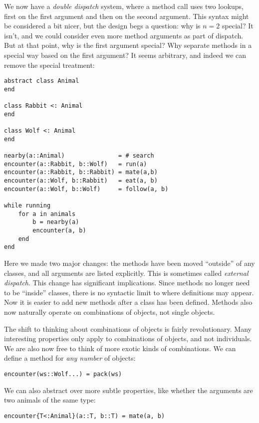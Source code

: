 We now have a \emph{double dispatch} system, where a method call
uses two lookups, first on the first argument and then on the
second argument.
This syntax might be considered a bit nicer, but the design
begs a question: why is $n=2$ special?
It isn't, and we could consider even more method arguments as part of
dispatch.
But at that point, why is the first argument special?
Why separate methods in a special way based on the first argument?
It seems arbitrary, and indeed we can remove the special treatment:

\begin{singlespace}
\begin{verbatim}
abstract class Animal
end

class Rabbit <: Animal
end

class Wolf <: Animal
end

nearby(a::Animal)               = # search
encounter(a::Rabbit, b::Wolf)   = run(a)
encounter(a::Rabbit, b::Rabbit) = mate(a,b)
encounter(a::Wolf, b::Rabbit)   = eat(a, b)
encounter(a::Wolf, b::Wolf)     = follow(a, b)

while running
    for a in animals
        b = nearby(a)
        encounter(a, b)
    end
end
\end{verbatim}
\end{singlespace}

Here we made two major changes: the methods have been moved ``outside''
of any classes, and all arguments are listed explicitly.
This is sometimes called \emph{external dispatch}.
This change has significant implications.
Since methods no longer need to be ``inside'' classes, there is no syntactic
limit to where definitions may appear.
Now it is easier to add new methods after a class has been defined.
Methods also now naturally operate on combinations of objects, not single objects.

The shift to thinking about combinations of objects is fairly revolutionary.
Many interesting properties only apply to combinations of objects, and not
individuals.
We are also now free to think of more exotic kinds of combinations.
We can define a method for \emph{any number} of objects:

\begin{verbatim}
encounter(ws::Wolf...) = pack(ws)
\end{verbatim}

\noindent
We can also abstract over more subtle properties, like whether the
arguments are two animals of the same type:

\begin{verbatim}
encounter{T<:Animal}(a::T, b::T) = mate(a, b)
\end{verbatim}

